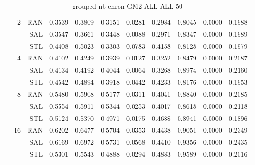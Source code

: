 \begin{center}
\begin{table}[htbp]
\begin{center}
\begin{tabular}{ | r | r | r | r | r | r | r | r | r | r | r |}
 & \multirow{3}{*}{2} & RAN & 0.3539 & 0.3809 & 0.3151 & 0.0281 & 0.2984 & 0.8045 & 0.0000 & 0.1988\\ \cline{3-11}
 &   & SAL & 0.3547 & 0.3661 & 0.3448 & 0.0088 & 0.2971 & 0.8347 & 0.0000 & 0.1989\\ \cline{3-11}
 &   & STL & 0.4408 & 0.5023 & 0.3303 & 0.0783 & 0.4158 & 0.8128 & 0.0000 & 0.1979\\ \cline{2-11}
 & \multirow{3}{*}{4} & RAN & 0.4102 & 0.4249 & 0.3939 & 0.0127 & 0.3252 & 0.8479 & 0.0000 & 0.2087\\ \cline{3-11}
 &   & SAL & 0.4134 & 0.4192 & 0.4044 & 0.0064 & 0.3268 & 0.8974 & 0.0000 & 0.2160\\ \cline{3-11}
 &   & STL & 0.4542 & 0.4894 & 0.3918 & 0.0442 & 0.4233 & 0.8176 & 0.0000 & 0.1953\\ \cline{2-11}
 & \multirow{3}{*}{8} & RAN & 0.5480 & 0.5908 & 0.5177 & 0.0311 & 0.4041 & 0.8840 & 0.0000 & 0.2085\\ \cline{3-11}
 &   & SAL & 0.5554 & 0.5911 & 0.5344 & 0.0253 & 0.4017 & 0.8618 & 0.0000 & 0.2118\\ \cline{3-11}
 &   & STL & 0.5124 & 0.5370 & 0.4971 & 0.0175 & 0.4688 & 0.8941 & 0.0000 & 0.1896\\ \cline{2-11}
 & \multirow{3}{*}{16} & RAN & 0.6202 & 0.6477 & 0.5704 & 0.0353 & 0.4438 & 0.9051 & 0.0000 & 0.2349\\ \cline{3-11}
 &   & SAL & 0.6169 & 0.6972 & 0.5731 & 0.0568 & 0.4410 & 0.9356 & 0.0000 & 0.2435\\ \cline{3-11}
 &   & STL & 0.5301 & 0.5543 & 0.4888 & 0.0294 & 0.4883 & 0.9589 & 0.0000 & 0.2016\\ \cline{2-11}
\hline
\end{tabular}
\caption{grouped-nb-enron-GM2-ALL-ALL-50}
\end{center}
 \end{table}
\end{center}

